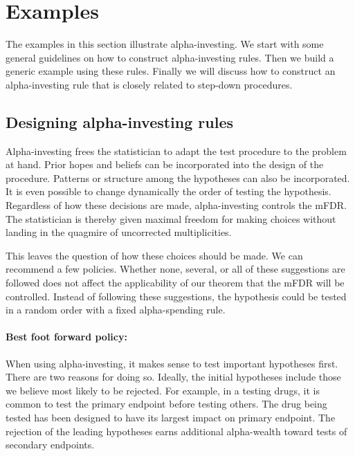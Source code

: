 \documentclass[12pt]{article}
\begin{document}
\section{Examples}              \label{sec:examples}           %

The examples in this section illustrate alpha-investing.  We
 start with some general guidelines on how to construct
 alpha-investing rules.  Then we build a generic example using
 these rules.  Finally we will discuss how to construct an alpha-investing rule that is closely related to step-down procedures.

\subsection{Designing alpha-investing rules}

Alpha-investing frees the statistician to adapt the test procedure to the problem at hand.  Prior hopes and beliefs can be incorporated into the design of
 the procedure.  Patterns or structure among the hypotheses can
 also be incorporated.  It is even possible to change dynamically
 the order of testing the hypothesis.  Regardless of how these decisions are made, alpha-investing controls the mFDR.  The
 statistician is thereby given maximal freedom for making choices without
 landing in the quagmire of uncorrected multiplicities.  
 
This leaves the question of how these choices should be made.
We can recommend a few policies.   Whether none, several, or all of these
 suggestions are followed does not affect the applicability of our
 theorem that the mFDR will be controlled.   Instead of following
 these suggestions, the hypothesis could be tested in a random order with
 a fixed alpha-spending rule.

\paragraph{Best foot forward policy:} When using alpha-investing, it makes sense to test important hypotheses first.  There are two reasons for doing so.
 Ideally, the initial hypotheses include those we believe most likely to be
 rejected.  For example, in a testing drugs, it is common to
 test the primary endpoint before testing others.  The drug
 being tested has been designed to have its largest impact on primary
 endpoint.  The rejection of the leading hypotheses earns additional alpha-wealth toward tests of secondary endpoints.
 
\end{document}
